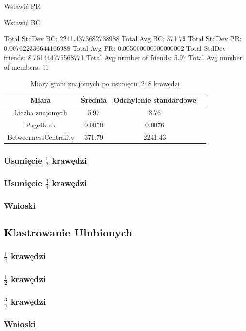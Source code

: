 \documentclass[10pt,a4paper,epic,carom]{article}
\begin{document}
Wstawić PR

Wstawić BC

Total StdDev BC: 2241.4373682738988
Total Avg BC: 371.79
Total StdDev PR: 0.007622336644166988
Total Avg PR: 0.005000000000000002
Total StdDev friends: 8.761444776568771
Total Avg number of friends: 5.97
Total Avg number of members: 11
\begin{table}[H]
  \caption{Miary grafu znajomych po usunięciu 248 krawędzi}
  \centering
    \begin{tabular}{cccc}
    \addlinespace
    \toprule
    Miara & Średnia  & Odchylenie standardowe \\
    \midrule
    Liczba znajomych & 5.97 & 8.76 \\
    PageRank & 0.0050 & 0.0076 \\
    BetweennessCentrality & 371.79 & 2241.43\\ 
    \bottomrule
    \end{tabular}
  \label{tab:addlabel}
\end{table}

\subsubsection {Usunięcie $\frac{1}{2}$ krawędzi}
\subsubsection {Usunięcie $\frac{3}{4}$ krawędzi}
\subsubsection {Wnioski}


\subsection {Klastrowanie Ulubionych}
\subsubsection {$\frac{1}{4}$ krawędzi}
\subsubsection {$\frac{1}{2}$ krawędzi}
\subsubsection {$\frac{3}{4}$ krawędzi}
\subsubsection {Wnioski}
\end{document}
